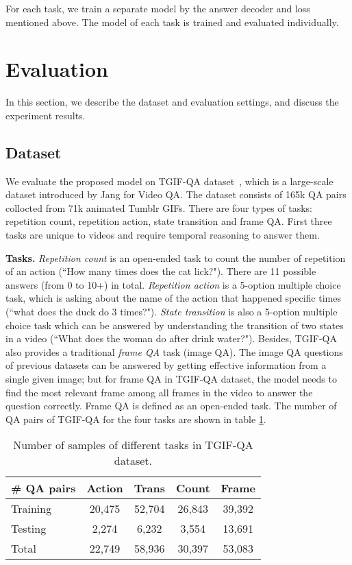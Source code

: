 \documentclass[10pt,twocolumn,letterpaper]{article}
\begin{document}
For each task, we train a separate model by the answer decoder and loss mentioned above. The model of each task is trained and evaluated individually.

\section{Evaluation}
\label{sec:eval}
In this section, we describe the dataset and evaluation settings, and discuss the experiment results.

\subsection{Dataset}
We evaluate the proposed model on TGIF-QA dataset~\cite{Jang_2017_CVPR}, which is a large-scale dataset introduced by Jang \etal for Video QA. The dataset consists of 165k QA pairs collocted from 71k animated Tumblr GIFs. There are four types of tasks: repetition count, repetition action, state transition and frame QA. First three tasks are unique to videos and require temporal reasoning to answer them.

\textbf{Tasks.} \textit{Repetition count} is an open-ended task to count the number of repetition of an action (\eg ``How many times does the cat
lick?"). There are 11 possible answers (\ie from 0 to 10+) in total. \textit{Repetition action} is a 5-option multiple choice task, which is asking about the name of the action that happened specific times (\eg ``what does the duck do 3 times?"). \textit{State transition} is also a 5-option multiple choice task which can be answered by understanding the transition of two states in a video (\eg ``What does the woman do after drink water?"). Besides, TGIF-QA also provides a traditional \textit{frame QA} task (\ie image QA). The image QA questions of previous datasets \cite{Antol_2015_ICCV, ren2015exploring, malinowski2014multi} can be answered by getting effective information from a single given image; but for frame QA in TGIF-QA dataset, the model needs to find the most relevant frame among all frames in the video to answer the question correctly. Frame QA is defined as an open-ended task. The number of QA pairs of TGIF-QA for the four tasks are shown in table \ref{tbl:dataset}.


\begin{table}[]
\centering
\caption{Number of samples of different tasks in TGIF-QA dataset.}
\vspace{5pt}
\label{tbl:dataset}
\begin{tabular}{l|cccc}
\hline
\# QA pairs     & Action    & Trans     & Count     & Frame     \\ \hline
Training        & 20,475    & 52,704    & 26,843    & 39,392    \\ \hline
Testing         & 2,274     & 6,232     & 3,554     & 13,691    \\ \hline
Total           & 22,749    & 58,936    & 30,397    & 53,083    \\ \hline
\end{tabular}
\end{table}
\end{document}
